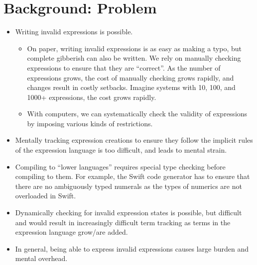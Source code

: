 \section{Background: Problem}

\begin{itemize}

      \item Writing invalid expressions is possible.
            \begin{itemize}

                  \item On paper, writing invalid expressions is as easy as
                        making a typo, but complete gibberish can also be
                        written. We rely on manually checking expressions to
                        ensure that they are ``correct''. As the number of
                        expressions grows, the cost of manually checking grows
                        rapidly, and changes result in costly setbacks. Imagine
                        systems with 10, 100, and 1000+ expressions, the cost
                        grows rapidly.
                  
                  \item With computers, we can systematically check the validity
                        of expressions by imposing various kinds of restrictions.

            \end{itemize}

      \item Mentally tracking expression creations to ensure they follow the
            implicit rules of the expression language is too difficult, and leads
            to mental strain.

      \item Compiling to ``lower languages'' requires special type checking before
            compiling to them. For example, the Swift code generator has to ensure
            that there are no ambiguously typed numerals as the types of numerics
            are not overloaded in Swift.

      \item Dynamically checking for invalid expression states is possible, but
            difficult and would result in increasingly difficult term tracking as
            terms in the expression language grow/are added.

      \item In general, being able to express invalid expressions causes large
            burden and mental overhead.

\end{itemize}


